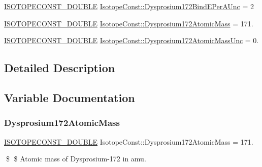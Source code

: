 \begin{DoxyCompactItemize}
\mbox{\hyperlink{group___isotope_const-_macros_ga8f45a7272ce02c0b4c65c44636ed719a}{I\+S\+O\+T\+O\+P\+E\+C\+O\+N\+S\+T\+\_\+\+D\+O\+U\+B\+LE}} \mbox{\hyperlink{group___isotope_const-_dysprosium-_dy172_gab65bb072ade7ec651f685cd088580650}{Isotope\+Const\+::\+Dysprosium172\+Bind\+E\+Per\+A\+Unc}} = 2
\item 
\mbox{\hyperlink{group___isotope_const-_macros_ga8f45a7272ce02c0b4c65c44636ed719a}{I\+S\+O\+T\+O\+P\+E\+C\+O\+N\+S\+T\+\_\+\+D\+O\+U\+B\+LE}} \mbox{\hyperlink{group___isotope_const-_dysprosium-_dy172_ga16ededeece403d821b8642aa6b411982}{Isotope\+Const\+::\+Dysprosium172\+Atomic\+Mass}} = 171.
\item 
\mbox{\hyperlink{group___isotope_const-_macros_ga8f45a7272ce02c0b4c65c44636ed719a}{I\+S\+O\+T\+O\+P\+E\+C\+O\+N\+S\+T\+\_\+\+D\+O\+U\+B\+LE}} \mbox{\hyperlink{group___isotope_const-_dysprosium-_dy172_ga464f38cecf5aa0530b41c093fe9a1c46}{Isotope\+Const\+::\+Dysprosium172\+Atomic\+Mass\+Unc}} = 0.
\end{DoxyCompactItemize}


\subsection{Detailed Description}


\subsection{Variable Documentation}
\mbox{\label{group___isotope_const-_dysprosium-_dy172_ga16ededeece403d821b8642aa6b411982}} 
\subsubsection{\texorpdfstring{Dysprosium172\+Atomic\+Mass}{Dysprosium172AtomicMass}}
{\footnotesize\ttfamily \mbox{\hyperlink{group___isotope_const-_macros_ga8f45a7272ce02c0b4c65c44636ed719a}{I\+S\+O\+T\+O\+P\+E\+C\+O\+N\+S\+T\+\_\+\+D\+O\+U\+B\+LE}} Isotope\+Const\+::\+Dysprosium172\+Atomic\+Mass = 171.}

\$ \$ Atomic mass of Dysprosium-\/172 in amu. \mbox{\label{group___isotope_const-_dysprosium-_dy172_ga464f38cecf5aa0530b41c093fe9a1c46}} 
